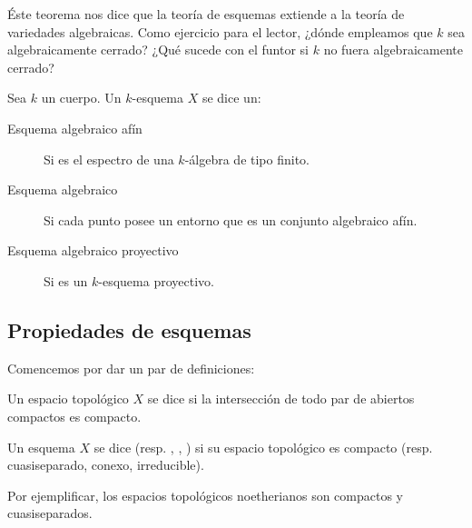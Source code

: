 Éste teorema nos dice que la teoría de esquemas extiende a la teoría de variedades algebraicas.
Como ejercicio para el lector, ¿dónde empleamos que $k$ sea algebraicamente cerrado? ¿Qué sucede con el funtor si $k$ no fuera algebraicamente cerrado?
\begin{mydef}
	Sea $k$ un cuerpo. Un $k$-esquema $X$ se dice un:
	\begin{description}
		\item[Esquema algebraico afín] Si es el espectro de una $k$-álgebra de tipo finito.
		\item[Esquema algebraico] Si cada punto posee un entorno que es un conjunto algebraico afín.
		\item[Esquema algebraico proyectivo] Si es un $k$-esquema proyectivo.
	\end{description}
\end{mydef}

\subsection{Propiedades de esquemas}
Comencemos por dar un par de definiciones:
\begin{mydef}
	Un espacio topológico $X$ se dice  si la intersección de todo par de abiertos compactos es compacto.
	\par
	Un esquema $X$ se dice  (resp. , , )
	si su espacio topológico es compacto (resp. cuasiseparado, conexo, irreducible).
\end{mydef}
Por ejemplificar, los espacios topológicos noetherianos son compactos y cuasiseparados.

